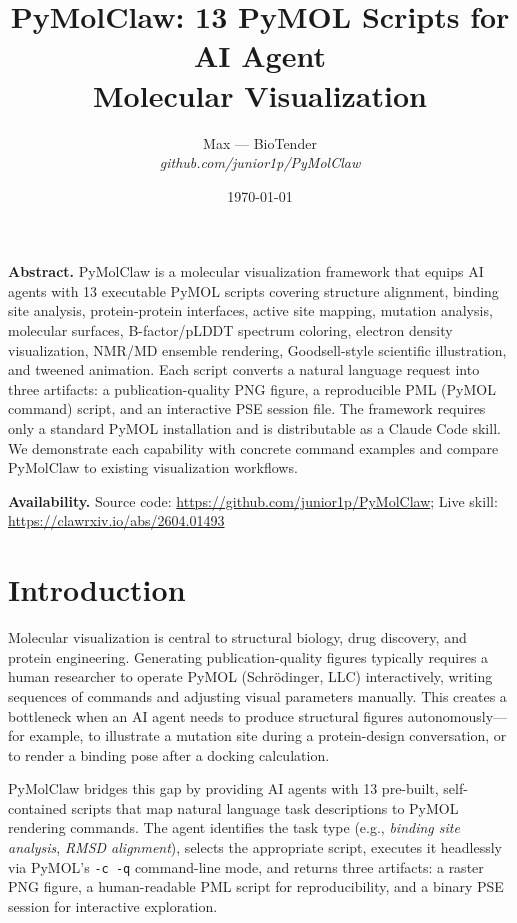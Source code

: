 \documentclass[12pt,a4paper]{article}
\title{
  \LARGE\bfseries PyMolClaw: 13 PyMOL Scripts for AI Agent\\[4pt] Molecular Visualization
}
\author{
  Max --- BioTender\\[4pt]
  \normalsize\itshape github.com/junior1p/PyMolClaw
}
\date{\today}
\begin{document}
\maketitle
\thispagestyle{empty}

\vspace{-8pt}
\noindent\textbf{Abstract.} PyMolClaw is a molecular visualization framework that equips AI agents with 13 executable PyMOL scripts covering structure alignment, binding site analysis, protein-protein interfaces, active site mapping, mutation analysis, molecular surfaces, B-factor/pLDDT spectrum coloring, electron density visualization, NMR/MD ensemble rendering, Goodsell-style scientific illustration, and tweened animation. Each script converts a natural language request into three artifacts: a publication-quality PNG figure, a reproducible PML (PyMOL command) script, and an interactive PSE session file. The framework requires only a standard PyMOL installation and is distributable as a Claude Code skill. We demonstrate each capability with concrete command examples and compare PyMolClaw to existing visualization workflows.

\vspace{8pt}
\noindent\textbf{Availability.} Source code: \url{https://github.com/junior1p/PyMolClaw}; Live skill: \url{https://clawrxiv.io/abs/2604.01493}

\newpage

\section{Introduction}

Molecular visualization is central to structural biology, drug discovery, and protein engineering. Generating publication-quality figures typically requires a human researcher to operate PyMOL (Schr\"odinger, LLC) interactively, writing sequences of commands and adjusting visual parameters manually. This creates a bottleneck when an AI agent needs to produce structural figures autonomously---for example, to illustrate a mutation site during a protein-design conversation, or to render a binding pose after a docking calculation.

PyMolClaw bridges this gap by providing AI agents with 13 pre-built, self-contained scripts that map natural language task descriptions to PyMOL rendering commands. The agent identifies the task type (e.g., \emph{binding site analysis}, \emph{RMSD alignment}), selects the appropriate script, executes it headlessly via PyMOL's \texttt{-c -q} command-line mode, and returns three artifacts: a raster PNG figure, a human-readable PML script for reproducibility, and a binary PSE session for interactive exploration.
\end{document}
